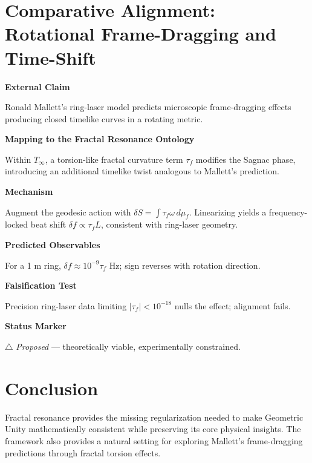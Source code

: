\section{Comparative Alignment: Rotational Frame-Dragging and Time-Shift}

\textbf{External Claim}

Ronald Mallett's ring-laser model predicts microscopic frame-dragging effects producing closed timelike curves in a rotating metric.

\textbf{Mapping to the Fractal Resonance Ontology}

Within $T_\infty$, a torsion-like fractal curvature term $\tau_f$ modifies the Sagnac phase, introducing an additional timelike twist analogous to Mallett's prediction.

\textbf{Mechanism}

Augment the geodesic action with $\delta S = \int \tau_f \omega \, d\mu_f$.
Linearizing yields a frequency-locked beat shift $\delta f \propto \tau_f L$, consistent with ring-laser geometry.

\textbf{Predicted Observables}

For a 1 m ring, $\delta f \approx 10^{-9} \tau_f$ Hz; sign reverses with rotation direction.

\textbf{Falsification Test}

Precision ring-laser data limiting $|\tau_f| < 10^{-18}$ nulls the effect; alignment fails.

\textbf{Status Marker}

$\triangle$ \textit{Proposed} --- theoretically viable, experimentally constrained.

\section{Conclusion}

Fractal resonance provides the missing regularization needed to make Geometric Unity mathematically consistent while preserving its core physical insights. The framework also provides a natural setting for exploring Mallett's frame-dragging predictions through fractal torsion effects.